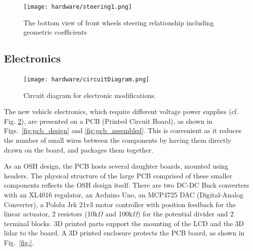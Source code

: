 \documentclass[a4paper]{article}
\begin{document}
	
	\begin{figure}[h]
		\texttt{[image: hardware/steering1.png]}
		\caption{The bottom view of front wheels steering relationship including geometric coefficients}
		\label{fig:steering}
	\end{figure}
	
	
	\subsection{Electronics}
	
	\begin{figure}[h]
		\texttt{[image: hardware/circuitDiagram.png]}
		\caption{Circuit diagram for electronic modifications.}
		\label{fig:circuitDiagram}
	\end{figure}
	
	
	The new vehicle electronics, which require different voltage power supplies (cf. Fig. \ref{fig:circuitDiagram}), are presented on a PCB (Printed Circuit Board), as shown in Figs.~\ref{fig:pcb_design} and \ref{fig:pcb_assembled}. This is convenient as it reduces the number of small wires between the components by having them directly drawn on the board, and packages them together.
	
	As an OSH design, the PCB hosts several daughter boards, mounted using headers. The physical structure of the large PCB comprised of these smaller components reflects the OSH design itself. There are two DC-DC Buck converters with an XL4016 regulator, an Arduino Uno, an MCP4725 DAC (Digital-Analog Converter), a Pololu Jrk 21v3 motor controller with position feedback for the linear actuator, 2 resistors (10k$\Omega$ and 100k$\Omega$) for the potential divider and 2 terminal blocks. 3D printed parts support the mounting of the LCD and the 3D lidar to the board. A 3D printed enclosure protects the PCB board, as shown in Fig.~\ref{fig:}.
	
\end{document}
